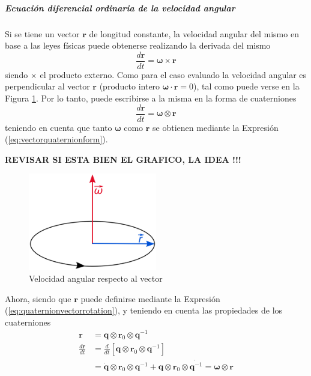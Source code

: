 \subparagraph{Ecuación diferencial ordinaria de la velocidad angular}
Si se tiene un vector $\bm{r}$ de longitud constante, la velocidad angular del mismo en base a las leyes físicas puede obtenerse realizando la derivada del mismo
\begin{equation}
    \frac{d\bm{r}}{dt} = \bm{\omega}\times \bm{r}
\end{equation}
siendo $\times$ el producto externo. Como para el caso evaluado la velocidad angular es perpendicular al vector $\bm{r}$ (producto intero $\bm{\omega}\cdot\bm{r} = 0$), tal como puede verse en la Figura \ref{fig:angularvelocity}. Por lo tanto, puede escribirse a la misma en la forma de cuaterniones
\begin{equation}
    \frac{d\bm{r}}{dt} = \bm{\omega} \otimes \bm{r}
\end{equation}
teniendo en cuenta que tanto $\bm{\omega}$ como $\bm{r}$ se obtienen mediante la Expresión (\ref{eq:vectorquaternionform}).

\textbf{REVISAR SI ESTA BIEN EL GRAFICO, LA IDEA !!!}
\begin{figure}[!ht]
    \centering
    \includegraphics[width=0.5\textwidth]{Img/AngularVelocity.png}
    \caption{Velocidad angular respecto al vector}
    \label{fig:angularvelocity}
\end{figure}

Ahora, siendo que $\bm{r}$ puede definirse mediante la Expresión (\ref{eq:quaternionvectorrotation}), y teniendo en cuenta las propiedades de los cuaterniones
\begin{align}
    \bm{r} &= \bm{q}\otimes \bm{r}_0 \otimes \bm{q}^{-1} \\
    \frac{d\bm{r}}{dt} &= \frac{d}{dt}\left[\bm{q}\otimes\bm{r}_0\otimes\bm{q}^{-1}\right] \\
    &= \dot{\bm{q}}\otimes\bm{r}_0\otimes\bm{q}^{-1} + \bm{q}\otimes\bm{r}_0\otimes\dot{\bm{q}^{-1}} = \bm{\omega}\otimes\bm{r}
\end{align}

